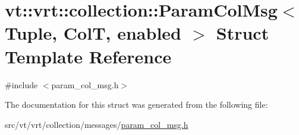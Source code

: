 \hypertarget{structvt_1_1vrt_1_1collection_1_1_param_col_msg}{}\section{vt\+:\+:vrt\+:\+:collection\+:\+:Param\+Col\+Msg$<$ Tuple, ColT, enabled $>$ Struct Template Reference}
\label{structvt_1_1vrt_1_1collection_1_1_param_col_msg}


{\ttfamily \#include $<$param\+\_\+col\+\_\+msg.\+h$>$}



The documentation for this struct was generated from the following file\+:\begin{DoxyCompactItemize}
\item 
src/vt/vrt/collection/messages/\hyperlink{param__col__msg_8h}{param\+\_\+col\+\_\+msg.\+h}\end{DoxyCompactItemize}
